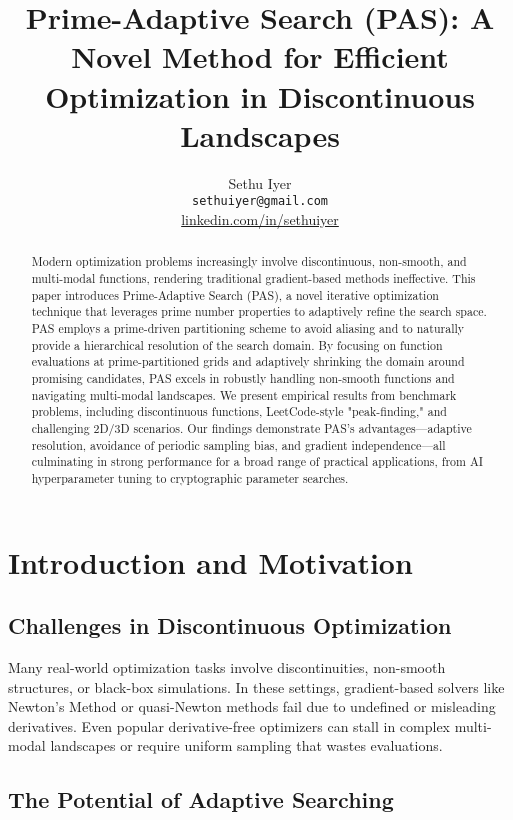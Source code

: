 \documentclass[10pt,twocolumn,letterpaper]{article}
\title{Prime-Adaptive Search (PAS): A Novel Method for Efficient Optimization in Discontinuous Landscapes}
\author{
  Sethu Iyer\\
  \texttt{sethuiyer@gmail.com}\\
  \href{https://linkedin.com/in/sethuiyer}{linkedin.com/in/sethuiyer}
}
\begin{document}
\maketitle

\begin{abstract}
Modern optimization problems increasingly involve discontinuous, non-smooth, and multi-modal functions, rendering traditional gradient-based methods ineffective. This paper introduces Prime-Adaptive Search (PAS), a novel iterative optimization technique that leverages prime number properties to adaptively refine the search space. PAS employs a prime-driven partitioning scheme to avoid aliasing and to naturally provide a hierarchical resolution of the search domain. By focusing on function evaluations at prime-partitioned grids and adaptively shrinking the domain around promising candidates, PAS excels in robustly handling non-smooth functions and navigating multi-modal landscapes. We present empirical results from benchmark problems, including discontinuous functions, LeetCode-style "peak-finding," and challenging 2D/3D scenarios. Our findings demonstrate PAS's advantages—adaptive resolution, avoidance of periodic sampling bias, and gradient independence—all culminating in strong performance for a broad range of practical applications, from AI hyperparameter tuning to cryptographic parameter searches.
\end{abstract}

\section{Introduction and Motivation}

\subsection{Challenges in Discontinuous Optimization}

Many real-world optimization tasks involve discontinuities, non-smooth structures, or black-box simulations. In these settings, gradient-based solvers like Newton's Method or quasi-Newton methods fail due to undefined or misleading derivatives. Even popular derivative-free optimizers can stall in complex multi-modal landscapes or require uniform sampling that wastes evaluations.

\subsection{The Potential of Adaptive Searching}
\end{document}
